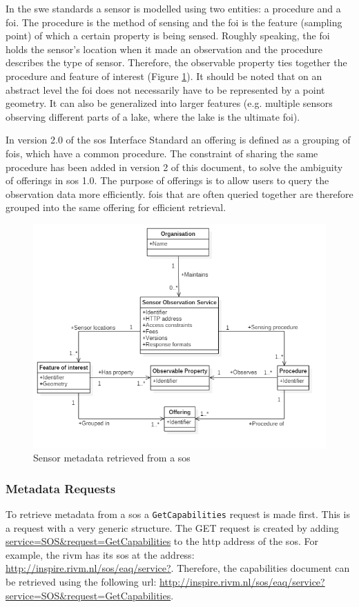 In the \ac{swe} standards a sensor is modelled using two entities: a procedure and a \acf{foi}. The procedure is the method of sensing and the \ac{foi} is the feature (sampling point) of which a certain property is being sensed. Roughly speaking, the \ac{foi} holds the sensor's location when it made an observation and the procedure describes the type of sensor. Therefore, the observable property ties together the procedure and feature of interest (Figure \ref{fig:SOS_UML}). It should be noted that on an abstract level the \ac{foi} does not necessarily have to be represented by a point geometry. It can also be generalized into larger features (e.g. multiple sensors observing different parts of a lake, where the lake is the ultimate \ac{foi}). 

In version 2.0 of the \acl{sos} Interface Standard \citep{SW:OGC2} an offering is defined as a grouping of \acp{foi}, which have a common procedure. The constraint of sharing the same procedure has been added in version 2 of this document, to solve the ambiguity of offerings in \ac{sos} 1.0. The purpose of offerings is to allow users to query the observation data more efficiently. \acp{foi} that are often queried together are therefore grouped into the same offering for efficient retrieval.        

\begin{figure}
	\centering
	\includegraphics[width=\linewidth]{UML/SOS_UML.PNG}
	\caption{Sensor metadata retrieved from a \ac*{sos}}
	\label{fig:SOS_UML}
\end{figure}

\subsubsection{Metadata Requests}
\label{par:metadataRequests}
To retrieve metadata from a \ac{sos} a \texttt{GetCapabilities} request is made first. This is a request with a very generic structure. The GET request is created by adding \url{service=SOS\&request=GetCapabilities} to the \ac{http} address of the \ac{sos}. For example, the \ac{rivm} has its \ac{sos} at the address: \url{http://inspire.rivm.nl/sos/eaq/service?}. Therefore, the capabilities document can be retrieved using the following \ac{url}: \url{http://inspire.rivm.nl/sos/eaq/service?service=SOS&request=GetCapabilities}. 

